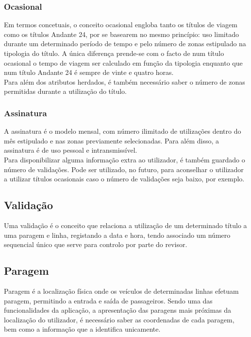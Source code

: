 \subsubsection{Ocasional}

Em termos concetuais, o conceito ocasional engloba tanto os títulos de viagem como os títulos Andante 24, por se basearem no mesmo princípio: uso limitado durante um determinado período de tempo e pelo número de zonas estipulado na tipologia do título. A única diferença prende-se com o facto de num título ocasional o tempo de viagem ser calculado em função da tipologia enquanto que num título Andante 24 é sempre de vinte e quatro horas.
\\Para além dos atributos herdados, é também necessário saber o número de zonas permitidas durante a utilização do título.

\subsubsection{Assinatura}

A assinatura é o modelo mensal, com número ilimitado de utilizações dentro do mês estipulado e nas zonas previamente selecionadas. Para além disso, a assinatura é de uso pessoal e intransmissível.
\\Para disponibilizar alguma informação extra ao utilizador, é também guardado o número de validações. Pode ser utilizado, no futuro, para aconselhar o utilizador a utilizar títulos ocasionais caso o número de validações seja baixo, por exemplo.

\subsection{Validação}
Uma validação é o conceito que relaciona a utilização de um determinado título a uma paragem e linha, registando a data e hora, tendo associado um número sequencial único que serve para controlo por parte do revisor.

\subsection{Paragem}
Paragem é a localização física onde os veículos de determinadas linhas efetuam paragem, permitindo a entrada e saída de passageiros. Sendo uma das funcionalidades da aplicação, a apresentação das paragens mais próximas da localização do utilizador, é necessário saber as coordenadas de cada paragem, bem como a informação que a identifica unicamente.


